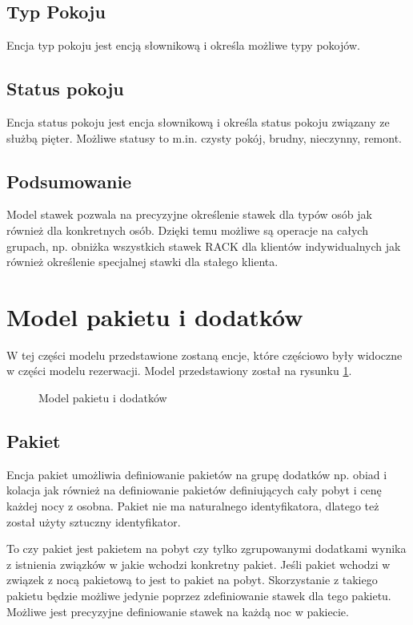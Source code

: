 \documentclass[a4paper,onecolumn,oneside,11pt,wide,floatssmall]{mwrep}
\theoremstyle{definition}
\theoremstyle{plain}%
\theoremstyle{remark}
\begin{document}
\subsection{Typ Pokoju}
Encja typ pokoju jest encją słownikową i określa możliwe typy pokojów.

\subsection{Status pokoju}
Encja status pokoju jest encja słownikową i określa status pokoju związany ze służbą pięter. Możliwe statusy to m.in. czysty pokój, brudny, nieczynny, remont.

\subsection{Podsumowanie}
Model stawek pozwala na precyzyjne określenie stawek dla typów osób jak również dla konkretnych osób. Dzięki temu możliwe są operacje na całych grupach, np. obniżka wszystkich stawek RACK dla klientów indywidualnych jak również określenie specjalnej stawki dla stałego klienta.


\section{Model pakietu i dodatków}
\label{model-pakietu-i-dodatkow}
W tej części modelu przedstawione zostaną encje, które częściowo były widoczne w części modelu rezerwacji. Model przedstawiony został na rysunku \ref{fig:db-logical-model-package}.

\begin{figure}[H]
  \begin{center}
  \end{center}
  \caption{Model pakietu i dodatków}
  \label{fig:db-logical-model-package}
\end{figure}

\subsection{Pakiet}
Encja pakiet umożliwia definiowanie pakietów na grupę dodatków np. obiad i kolacja jak również na definiowanie pakietów definiujących cały pobyt i cenę każdej nocy z osobna. Pakiet nie ma naturalnego identyfikatora, dlatego też został użyty sztuczny identyfikator.

To czy pakiet jest pakietem na pobyt czy tylko zgrupowanymi dodatkami wynika z istnienia związków w jakie wchodzi konkretny pakiet. Jeśli pakiet wchodzi w związek z nocą pakietową to jest to pakiet na pobyt. Skorzystanie z takiego pakietu będzie możliwe jedynie poprzez zdefiniowanie stawek dla tego pakietu. Możliwe jest precyzyjne definiowanie stawek na każdą noc w pakiecie.
\end{document}
